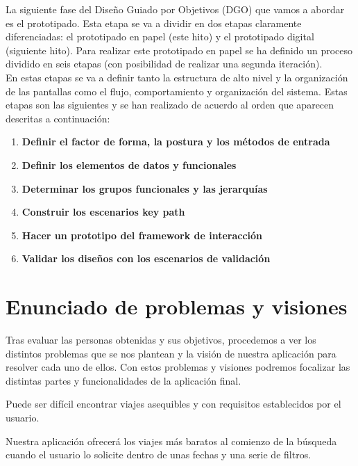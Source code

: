 
La siguiente fase del Diseño Guiado por Objetivos (DGO) que vamos a abordar es
el prototipado. Esta etapa se va a dividir en dos etapas claramente
diferenciadas: el prototipado en papel (este hito) y el prototipado digital
(siguiente hito). Para realizar este prototipado en papel se ha definido un
proceso dividido en seis etapas (con posibilidad de realizar una segunda
iteración). \\

En estas etapas se va a definir tanto la estructura de alto nivel y la
organización de las pantallas como el flujo, comportamiento y organización del
sistema. Estas etapas son las siguientes y se han realizado de acuerdo al orden
que aparecen descritas a continuación:
\begin{enumerate}
      \item \textbf{Definir el factor de forma, la postura y los métodos de entrada}
      \item \textbf{Definir los elementos de datos y funcionales}
      \item \textbf{Determinar los grupos funcionales y las jerarquías}
      \item \textbf{Construir los escenarios key path}
      \item \textbf{Hacer un prototipo del framework de interacción}
      \item \textbf{Validar los diseños con los escenarios de validación}
\end{enumerate}

\section{Enunciado de problemas y visiones}

Tras evaluar las personas obtenidas y sus objetivos, procedemos a ver los
distintos problemas que se nos plantean y la visión de nuestra aplicación para
resolver cada uno de ellos. Con estos problemas y visiones podremos focalizar
las distintas partes y funcionalidades de la aplicación final.

\begin{problema}

      Puede ser difícil encontrar viajes asequibles y con requisitos establecidos por
      el usuario.

            {\centering
                  \begin{vision} \justifying\noindent
                        Nuestra aplicación ofrecerá los viajes más baratos al comienzo de la búsqueda cuando el usuario lo solicite dentro de unas fechas y una serie de filtros.

                  \end{vision}}
\end{problema}

